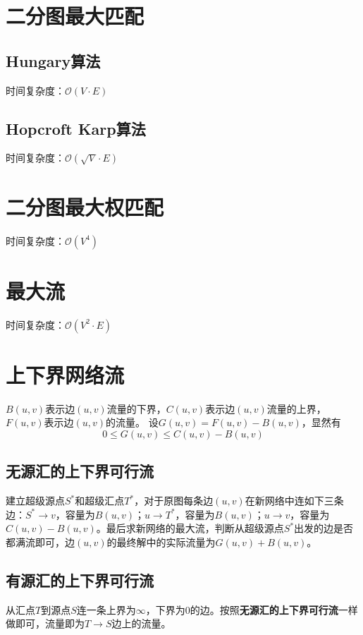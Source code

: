 \documentclass[openany, a4paper, 10pt]{book}
\begin{document}
\begin{spacing}{1.0}
		\section{二分图最大匹配}
			\subsection{Hungary算法}
				时间复杂度：$\mathcal{O}(V \cdot E)$
				
			\subsection{Hopcroft Karp算法}
				时间复杂度：$\mathcal{O}(\sqrt{V} \cdot E)$
				
		\section{二分图最大权匹配}
			时间复杂度：$\mathcal{O}(V^4)$
			
		\section{最大流}
			时间复杂度：$\mathcal{O}(V^2 \cdot E)$
			
		\section{上下界网络流}
			$B(u,v)$表示边$(u,v)$流量的下界，$C(u,v)$表示边$(u,v)$流量的上界，$F(u,v)$表示边$(u,v)$的流量。
			设$G(u,v) = F(u,v) - B(u,v)$，显然有
			$$0 \leq G(u,v) \leq C(u,v)-B(u,v)$$
		\subsection{无源汇的上下界可行流}
			建立超级源点$S^*$和超级汇点$T^*$，对于原图每条边$(u,v)$在新网络中连如下三条边：$S^* \rightarrow v$，容量为$B(u,v)$；$u \rightarrow T^*$，容量为$B(u,v)$；$u \rightarrow v$，容量为$C(u,v) - B(u,v)$。最后求新网络的最大流，判断从超级源点$S^*$出发的边是否都满流即可，边$(u,v)$的最终解中的实际流量为$G(u,v)+B(u,v)$。
		\subsection{有源汇的上下界可行流}
			从汇点$T$到源点$S$连一条上界为$\infty$，下界为$0$的边。按照\textbf{无源汇的上下界可行流}一样做即可，流量即为$T \rightarrow S$边上的流量。

\end{spacing}
\end{document}
